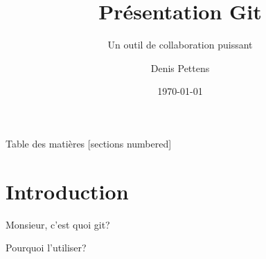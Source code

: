 \documentclass{beamer}
\title{Présentation Git}
\subtitle{Un outil de collaboration puissant}
\date{\today}
\author{Denis Pettens}
\institute{Louvain-li-Nux}
\begin{document}
  \maketitle

  \begin{frame}{Table des matières}
      [sections numbered]
      \tableofcontents[hideallsubsections]
  \end{frame}

  \section{Introduction}
  \begin{frame}{Monsieur, c'est quoi git?}

  \end{frame}
  \begin{frame}{Pourquoi l'utiliser?}

  \end{frame}


\end{document}
